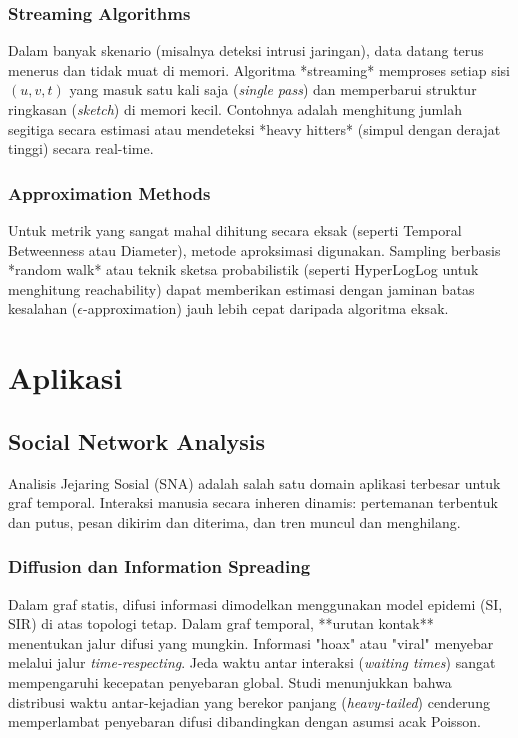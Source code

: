 \documentclass[12pt,a4paper]{book}
\begin{document}
\section{Streaming Algorithms}
Dalam banyak skenario (misalnya deteksi intrusi jaringan), data datang terus menerus dan tidak muat di memori.
Algoritma *streaming* memproses setiap sisi $(u, v, t)$ yang masuk satu kali saja (\textit{single pass}) dan memperbarui struktur ringkasan (\textit{sketch}) di memori kecil. Contohnya adalah menghitung jumlah segitiga secara estimasi atau mendeteksi *heavy hitters* (simpul dengan derajat tinggi) secara real-time.

\section{Approximation Methods}
Untuk metrik yang sangat mahal dihitung secara eksak (seperti Temporal Betweenness atau Diameter), metode aproksimasi digunakan.
Sampling berbasis *random walk* atau teknik sketsa probabilistik (seperti HyperLogLog untuk menghitung reachability) dapat memberikan estimasi dengan jaminan batas kesalahan ($\epsilon$-approximation) jauh lebih cepat daripada algoritma eksak.

\part{Aplikasi}

\chapter{Social Network Analysis}
Analisis Jejaring Sosial (SNA) adalah salah satu domain aplikasi terbesar untuk graf temporal. Interaksi manusia secara inheren dinamis: pertemanan terbentuk dan putus, pesan dikirim dan diterima, dan tren muncul dan menghilang.

\section{Diffusion dan Information Spreading}
Dalam graf statis, difusi informasi dimodelkan menggunakan model epidemi (SI, SIR) di atas topologi tetap. Dalam graf temporal, **urutan kontak** menentukan jalur difusi yang mungkin.
Informasi "hoax" atau "viral" menyebar melalui jalur \textit{time-respecting}. Jeda waktu antar interaksi (\textit{waiting times}) sangat mempengaruhi kecepatan penyebaran global. Studi menunjukkan bahwa distribusi waktu antar-kejadian yang berekor panjang (\textit{heavy-tailed}) cenderung memperlambat penyebaran difusi dibandingkan dengan asumsi acak Poisson.
\end{document}
